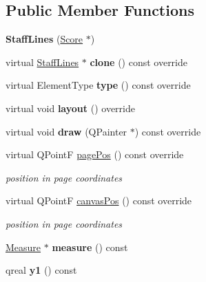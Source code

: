 \subsection*{Public Member Functions}
\begin{DoxyCompactItemize}
\item 
\mbox{\label{class_ms_1_1_staff_lines_a82ae5e3578d7b19a8aecb42c07605e7e}} 
{\bfseries Staff\+Lines} (\hyperlink{class_ms_1_1_score}{Score} $\ast$)
\item 
\mbox{\label{class_ms_1_1_staff_lines_ab0db15c3b38ec0c726c6415b5749aa92}} 
virtual \hyperlink{class_ms_1_1_staff_lines}{Staff\+Lines} $\ast$ {\bfseries clone} () const override
\item 
\mbox{\label{class_ms_1_1_staff_lines_aa1680c8e657cd99c292122333e67f3b6}} 
virtual Element\+Type {\bfseries type} () const override
\item 
\mbox{\label{class_ms_1_1_staff_lines_a05adc42ce0f34fe2f08fa161e64be36a}} 
virtual void {\bfseries layout} () override
\item 
\mbox{\label{class_ms_1_1_staff_lines_a8de9e76363a63b6048fc924b20a22111}} 
virtual void {\bfseries draw} (Q\+Painter $\ast$) const override
\item 
\mbox{\label{class_ms_1_1_staff_lines_a2944981d73d75c7af69553ce1e82af0d}} 
virtual Q\+PointF \hyperlink{class_ms_1_1_staff_lines_a2944981d73d75c7af69553ce1e82af0d}{page\+Pos} () const override
\begin{DoxyCompactList}\small\item\em position in page coordinates \end{DoxyCompactList}\item 
\mbox{\label{class_ms_1_1_staff_lines_a66b7898106ea89c187b7d21f1e612ef4}} 
virtual Q\+PointF \hyperlink{class_ms_1_1_staff_lines_a66b7898106ea89c187b7d21f1e612ef4}{canvas\+Pos} () const override
\begin{DoxyCompactList}\small\item\em position in page coordinates \end{DoxyCompactList}\item 
\mbox{\label{class_ms_1_1_staff_lines_a705e520071955e8031f8d252469f8c1b}} 
\hyperlink{class_ms_1_1_measure}{Measure} $\ast$ {\bfseries measure} () const
\item 
\mbox{\label{class_ms_1_1_staff_lines_a29ecab969e7bab002214d62f97af2658}} 
qreal {\bfseries y1} () const
\end{DoxyCompactItemize}
